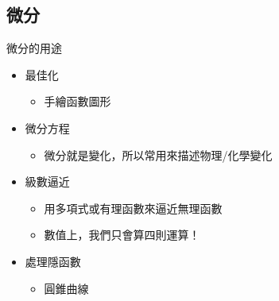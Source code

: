 \documentclass{beamer}
\begin{document}
\begin{CJK}{UTF8}{bsmi}
\section{微分}
\begin{frame}{微分的用途}
  \begin{itemize}
    \item 最佳化
      \begin{itemize}
	\item 手繪函數圖形
      \end{itemize}
    \item 微分方程
      \begin{itemize}
	\item 微分就是變化，所以常用來描述物理/化學變化
      \end{itemize}
    \item 級數逼近
      \begin{itemize}
	\item 用多項式或有理函數來逼近無理函數
	\item 數值上，我們只會算四則運算！
      \end{itemize}
    \item 處理隱函數
      \begin{itemize}
	\item 圓錐曲線
      \end{itemize}
  \end{itemize}
\end{frame}


\end{CJK}
\end{document}
